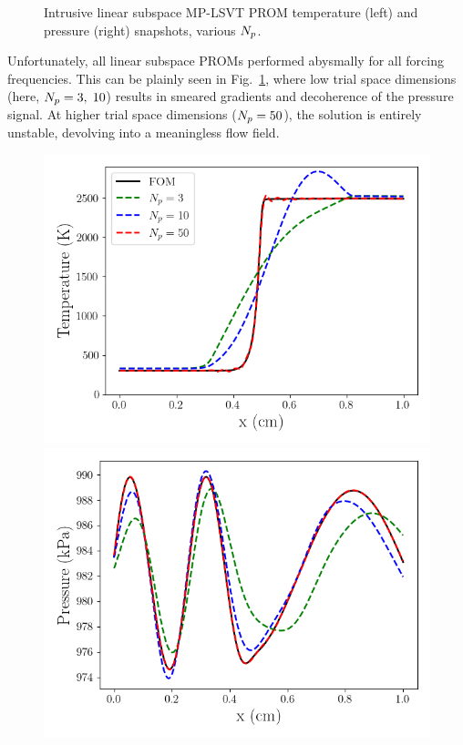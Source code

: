 \begin{figure}
\begin{minipage}{0.49\linewidth}
    \end{minipage}
    \caption{\label{fig:flameLinearROM}Intrusive linear subspace MP-LSVT PROM temperature (left) and pressure (right) snapshots, various $N_p$.}
\end{figure}

Unfortunately, all linear subspace PROMs performed abysmally for all forcing frequencies. This can be plainly seen in Fig.~\ref{fig:flameLinearROM}, where low trial space dimensions (here, $N_p = 3, \; 10$) results in smeared gradients and decoherence of the pressure signal. At higher trial space dimensions ($N_p = 50$), the solution is entirely unstable, devolving into a meaningless flow field. 

\begin{figure}
    \begin{minipage}{0.49\linewidth}
        \includegraphics[width=0.99\linewidth]{Chapters/TransientFlame/Images/linear/proj_temp_snaps.png}
    \end{minipage}
    \begin{minipage}{0.49\linewidth}
        \includegraphics[width=0.99\linewidth]{Chapters/TransientFlame/Images/linear/proj_press_snaps.png}

\end{minipage}
\end{figure}
